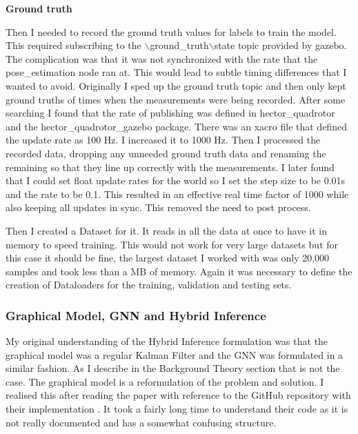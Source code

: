 \documentclass[]{../resources/final_report}
\begin{document}
\textbf{Ground truth}

Then I needed to record the ground truth values for labels to train the model. This required subscribing to the $\backslash$ground\_truth$\backslash$state topic provided by gazebo. The complication was that it was not synchronized with the rate that the pose\_estimation node ran at. This would lead to subtle timing differences that I wanted to avoid. Originally I sped up the ground truth topic and then only kept ground truths of times when the measurements were being recorded.
After some searching I found that the rate of publishing was defined in hector\_quadrotor and the hector\_quadrotor\_gazebo package. There was an xacro file that defined the update rate as 100 Hz. I increased it to 1000 Hz.
Then I processed the recorded data, dropping any unneeded ground truth data and renaming the remaining so that they line up correctly with the measurements.
I later found that I could set float update rates for the world so I set the step size to be 0.01s and the rate to be 0.1. This resulted in an effective real time factor of 1000 while also keeping all updates in sync. This removed the need to post process.

Then I created a Dataset for it. It reads in all the data at once to have it in memory to speed training. This would not work for very large datasets but for this case it should be fine, the largest dataset I worked with was only 20,000 samples and took less than a MB of memory. Again it was necessary to define the creation of Dataloaders for the training, validation and testing sets.

\subsubsection{Graphical Model, GNN and Hybrid Inference}

My original understanding of the Hybrid Inference formulation was that the graphical model was a regular Kalman Filter and the GNN was formulated in a similar fashion. As I describe in the Background Theory section that is not the case. The graphical model is a reformulation of the problem and solution. I realised this after reading the paper with reference to the GitHub repository with their implementation \cite{vgsatorrasgithub}. It took a fairly long time to understand their code as it is not really documented and has a somewhat confusing structure.
\end{document}
